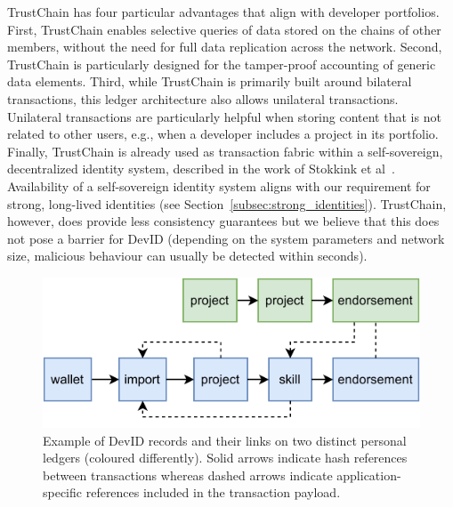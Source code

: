 TrustChain has four particular advantages that align with developer portfolios.
First, TrustChain enables selective queries of data stored on the chains of other members, without the need for full data replication across the network.
Second, TrustChain is particularly designed for the tamper-proof accounting of generic data elements.
Third, while TrustChain is primarily built around bilateral transactions, this ledger architecture also allows unilateral transactions.
Unilateral transactions are particularly helpful when storing content that is not related to other users, e.g., when a developer includes a project in its portfolio.
Finally, TrustChain is already used as transaction fabric within a self-sovereign, decentralized identity system, described in the work of Stokkink et al~\cite{stokkink2018deployment}.
Availability of a self-sovereign identity system aligns with our requirement for strong, long-lived identities (see Section~\ref{subsec:strong_identities}).
TrustChain, however, does provide less consistency guarantees but we believe that this does not pose a barrier for DevID (depending on the system parameters and network size, malicious behaviour can usually be detected within seconds).

\begin{figure}[t!]
	\centering
	\includegraphics[width=.8\linewidth]{devid/resources/trustchain_devid.pdf}
	\caption{Example of DevID records and their links on two distinct personal ledgers (coloured differently). Solid arrows indicate hash references between transactions whereas dashed arrows indicate application-specific references included in the transaction payload.}
	\label{fig:devid_trustchain}
\end{figure}

